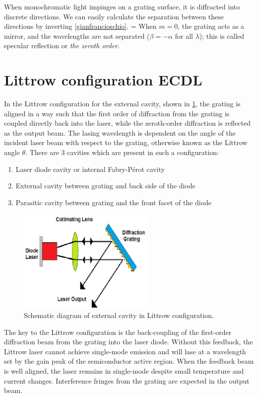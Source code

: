 When monochromatic light impinges on a grating surface, it is diffracted into discrete directions.
We can easily calculate the  separation between these directions by inverting \cref{gianfrancioschio}.
\mate
\beta[\lambda]=\arcsin{}
\atem
When $m=0$, the grating acts as a mirror, and the wavelengths are not separated ($\beta=-\alpha$ for all $\lambda$); this is called specular reflection or \textit{the zeroth order}. 


\section{Littrow configuration ECDL}\label{Littrowsection}
In the Littrow configuration for the external cavity, shown in \cref{littrow2}, the grating is aligned in a way such that the first order of diffraction from the grating is coupled directly back into the laser, while the zeroth-order diffraction is reflected as the output beam. The lasing wavelength is dependent on the angle of the incident laser beam with respect to the grating, otherwise known as the Littrow angle $\theta$.
There are 3 cavities which are present in such a configuration:
\begin{enumerate}
\item Laser diode cavity or internal Fabry-P\'{e}rot cavity
\item External cavity between grating and back side of the diode 
\item Parasitic cavity between grating and the front facet of the diode
\end{enumerate}

\begin{figure}[!t]\centering
\includegraphics[width=0.6\linewidth, height=5cm, draft=\foto]{eps/littrow2.eps}
\caption{Schematic diagram of external cavity in Littrow configuration.}
\label{littrow2}
\end{figure}

The key to the Littrow configuration is the back-coupling of the first-order diffraction beam from the grating into the laser diode. Without this feedback, the Littrow laser cannot achieve single-mode emission and will lase at a wavelength set by the gain peak of the semiconductor active region. When the feedback beam is well aligned, the laser remains in single-mode despite small temperature and current changes. Interference fringes from the grating are expected in the output beam.

